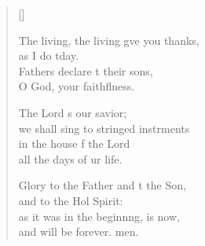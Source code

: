 \begin{verse}[\versewidth]
\begin{patverse}
The living, the living g\pointup{\i}ve you thanks,\Med\\
as I do tday.\\
Fathers declare t their sons,\Med\\
O God, your faithflness.

The Lord \pointup{\i}s our savior;\Med\\
we shall sing to stringed instrments\\
in the house f the Lord\Med\\
all the days of ur life.

Glory to the Father and t the Son,\Med\\
and to the Hol Spirit:\\
as it was in the beginn\pointup{\i}ng, is now,\Med\\
and will be forever. men. 
  \end{patverse}
\end{verse}
